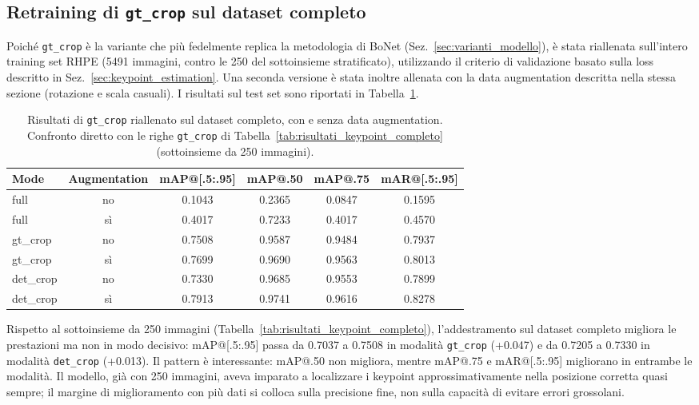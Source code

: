 \subsection{Retraining di \texttt{gt\_crop} sul dataset completo}
\label{sec:retraining_gt_crop_full}

Poiché \texttt{gt\_crop} è la variante che più fedelmente replica la
metodologia di BoNet (Sez.~\ref{sec:varianti_modello}), è stata
riallenata sull'intero training set RHPE (5491 immagini, contro le 250
del sottoinsieme stratificato), utilizzando il criterio di validazione
basato sulla loss descritto in Sez.~\ref{sec:keypoint_estimation}. Una
seconda versione è stata inoltre allenata con la data augmentation
descritta nella stessa sezione (rotazione e scala casuali). I risultati
sul test set sono riportati in
Tabella~\ref{tab:risultati_gt_crop_fulldata}.

\begin{table}[H]
\centering
\caption{Risultati di \texttt{gt\_crop} riallenato sul dataset completo,
con e senza data augmentation. Confronto diretto con le righe
\texttt{gt\_crop} di Tabella~\ref{tab:risultati_keypoint_completo}
(sottoinsieme da 250 immagini).}
\label{tab:risultati_gt_crop_fulldata}
\smallskip
\small
\begin{tabular}{lccccc}
\toprule
Mode & Augmentation & mAP@[.5:.95] & mAP@.50 & mAP@.75 & mAR@[.5:.95] \\
\midrule
full      & no & 0.1043 & 0.2365 & 0.0847 & 0.1595 \\
full      & sì & 0.4017 & 0.7233 & 0.4017 & 0.4570 \\
gt\_crop  & no & 0.7508 & 0.9587 & 0.9484 & 0.7937 \\
gt\_crop  & sì & 0.7699 & 0.9690 & 0.9563 & 0.8013 \\
det\_crop & no & 0.7330 & 0.9685 & 0.9553 & 0.7899 \\
det\_crop & sì & 0.7913 & 0.9741 & 0.9616 & 0.8278 \\
\bottomrule
\end{tabular}
\end{table}

Rispetto al sottoinsieme da 250 immagini
(Tabella~\ref{tab:risultati_keypoint_completo}), l'addestramento sul
dataset completo migliora le prestazioni ma non in modo decisivo:
mAP@[.5:.95] passa da 0.7037 a 0.7508 in modalità \texttt{gt\_crop}
(+0.047) e da 0.7205 a 0.7330 in modalità \texttt{det\_crop} (+0.013).
Il pattern è interessante: mAP@.50 non migliora, mentre mAP@.75 e
mAR@[.5:.95] migliorano in entrambe le modalità. Il modello, già con 250
immagini, aveva imparato a localizzare i keypoint approssimativamente
nella posizione corretta quasi sempre; il margine di miglioramento con
più dati si colloca sulla precisione fine, non sulla capacità di evitare
errori grossolani.

